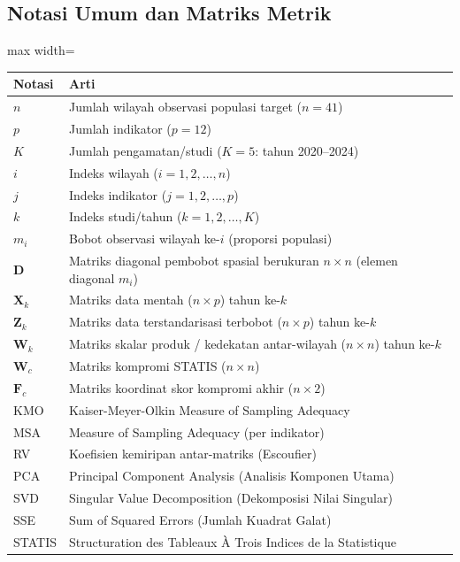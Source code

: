 \documentclass[11pt,a4paper]{article}
\begin{document}
\subsection*{Notasi Umum dan Matriks Metrik}
\begin{adjustbox}{max width=\textwidth}
\begin{tabular}{ll}
\toprule
\textbf{Notasi} & \textbf{Arti} \\
\midrule
$n$ & Jumlah wilayah observasi populasi target ($n = 41$) \\
$p$ & Jumlah indikator ($p = 12$) \\
$K$ & Jumlah pengamatan/studi ($K = 5$: tahun 2020--2024) \\
$i$ & Indeks wilayah ($i = 1, 2, \ldots, n$) \\
$j$ & Indeks indikator ($j = 1, 2, \ldots, p$) \\
$k$ & Indeks studi/tahun ($k = 1, 2, \ldots, K$) \\
$m_i$ & Bobot observasi wilayah ke-$i$ (proporsi populasi) \\
$\mathbf{D}$ & Matriks diagonal pembobot spasial berukuran $n \times n$ (elemen diagonal $m_i$) \\
$\mathbf{X}_k$ & Matriks data mentah ($n \times p$) tahun ke-$k$ \\
$\mathbf{Z}_k$ & Matriks data terstandarisasi terbobot ($n \times p$) tahun ke-$k$ \\
$\mathbf{W}_k$ & Matriks skalar produk / kedekatan antar-wilayah ($n \times n$) tahun ke-$k$ \\
$\mathbf{W}_c$ & Matriks kompromi STATIS ($n \times n$) \\
$\mathbf{F}_c$ & Matriks koordinat skor kompromi akhir ($n \times 2$) \\
KMO & Kaiser-Meyer-Olkin Measure of Sampling Adequacy \\
MSA & Measure of Sampling Adequacy (per indikator) \\
RV & Koefisien kemiripan antar-matriks (Escoufier) \\
PCA & Principal Component Analysis (Analisis Komponen Utama) \\
SVD & Singular Value Decomposition (Dekomposisi Nilai Singular) \\
SSE & Sum of Squared Errors (Jumlah Kuadrat Galat) \\
STATIS & Structuration des Tableaux \`A Trois Indices de la Statistique \\
\bottomrule
\end{tabular}
\end{adjustbox}
\end{document}
